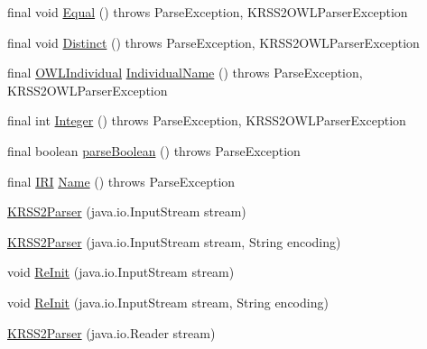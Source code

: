 \begin{DoxyCompactItemize}
\item 
final void \hyperlink{classde_1_1uulm_1_1ecs_1_1ai_1_1owlapi_1_1krssparser_1_1_k_r_s_s2_parser_a6da0728c2eb89388b9992d9e89e4b55d}{Equal} ()  throws Parse\-Exception, K\-R\-S\-S2\-O\-W\-L\-Parser\-Exception 
\item 
final void \hyperlink{classde_1_1uulm_1_1ecs_1_1ai_1_1owlapi_1_1krssparser_1_1_k_r_s_s2_parser_ad7867eef7af6b2b21b3b9a6efcfe5bc8}{Distinct} ()  throws Parse\-Exception, K\-R\-S\-S2\-O\-W\-L\-Parser\-Exception 
\item 
final \hyperlink{interfaceorg_1_1semanticweb_1_1owlapi_1_1model_1_1_o_w_l_individual}{O\-W\-L\-Individual} \hyperlink{classde_1_1uulm_1_1ecs_1_1ai_1_1owlapi_1_1krssparser_1_1_k_r_s_s2_parser_a9e4071796d9c2b69a6158f3b7b94e6a6}{Individual\-Name} ()  throws Parse\-Exception,     K\-R\-S\-S2\-O\-W\-L\-Parser\-Exception 
\item 
final int \hyperlink{classde_1_1uulm_1_1ecs_1_1ai_1_1owlapi_1_1krssparser_1_1_k_r_s_s2_parser_a29bb85326dea71946ac08727b047ea2f}{Integer} ()  throws Parse\-Exception, K\-R\-S\-S2\-O\-W\-L\-Parser\-Exception 
\item 
final boolean \hyperlink{classde_1_1uulm_1_1ecs_1_1ai_1_1owlapi_1_1krssparser_1_1_k_r_s_s2_parser_ae535b5748adb6376c9712c7537082147}{parse\-Boolean} ()  throws Parse\-Exception 
\item 
final \hyperlink{classorg_1_1semanticweb_1_1owlapi_1_1model_1_1_i_r_i}{I\-R\-I} \hyperlink{classde_1_1uulm_1_1ecs_1_1ai_1_1owlapi_1_1krssparser_1_1_k_r_s_s2_parser_afee8f092bd11d382e730c4dbabc4c8db}{Name} ()  throws Parse\-Exception 
\item 
\hyperlink{classde_1_1uulm_1_1ecs_1_1ai_1_1owlapi_1_1krssparser_1_1_k_r_s_s2_parser_a68d322eefdbf6a4623cca8b440772a3c}{K\-R\-S\-S2\-Parser} (java.\-io.\-Input\-Stream stream)
\item 
\hyperlink{classde_1_1uulm_1_1ecs_1_1ai_1_1owlapi_1_1krssparser_1_1_k_r_s_s2_parser_aee1326abc4f6ad822716cbe62b4f95d0}{K\-R\-S\-S2\-Parser} (java.\-io.\-Input\-Stream stream, String encoding)
\item 
void \hyperlink{classde_1_1uulm_1_1ecs_1_1ai_1_1owlapi_1_1krssparser_1_1_k_r_s_s2_parser_a2b039dc6b2aa36344e2fec9d627806ea}{Re\-Init} (java.\-io.\-Input\-Stream stream)
\item 
void \hyperlink{classde_1_1uulm_1_1ecs_1_1ai_1_1owlapi_1_1krssparser_1_1_k_r_s_s2_parser_ada6578687e0f4ac748098936e746619f}{Re\-Init} (java.\-io.\-Input\-Stream stream, String encoding)
\item 
\hyperlink{classde_1_1uulm_1_1ecs_1_1ai_1_1owlapi_1_1krssparser_1_1_k_r_s_s2_parser_a85a5f7abd17e5ada88b16fe6ec1afee2}{K\-R\-S\-S2\-Parser} (java.\-io.\-Reader stream)

\end{DoxyCompactItemize}
